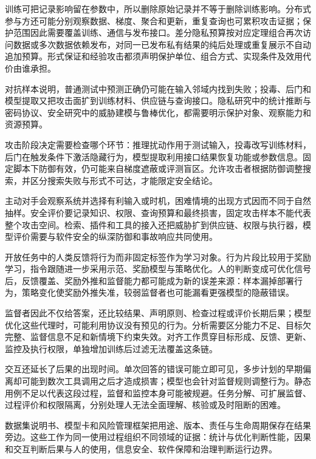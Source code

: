 训练可把记录影响留在参数中，所以删除原始记录并不等于删除训练影响。分布式参与方还可能分别观察数据、梯度、聚合和更新，重复查询也可累积攻击证据；保护范围因此需要覆盖训练、通信与发布接口。差分隐私预算按对应定理组合再次访问数据或多次数据依赖发布，对同一已发布私有结果的纯后处理或重复展示不自动追加预算。形式保证和经验攻击都须声明保护单位、组合方式、实现条件及效用代价由谁承担。

对抗样本说明，普通测试中预测正确仍可能在输入邻域内找到失败；投毒、后门和模型提取又把攻击面扩到训练材料、供应链与查询接口。隐私研究中的统计推断与密码协议、安全研究中的威胁建模与鲁棒优化，都需要明示保护对象、观察能力和资源预算。

攻击阶段决定需要检查哪个环节：推理扰动作用于测试输入，投毒改写训练材料，后门在触发条件下激活隐藏行为，模型提取利用接口结果恢复功能或参数信息。固定脚本下防御有效，仍可能来自梯度遮蔽或评测盲区。允许攻击者根据防御调整搜索，并区分搜索失败与形式不可达，才能限定安全结论。

主动对手会观察系统并选择有利输入或时机，困难情境的出现方式因而不同于自然抽样。安全评价要记录知识、权限、查询预算和最终损害，固定攻击样本不能代表整个攻击空间。检索、插件和工具的接入还把威胁扩到供应链、权限与执行器，模型评价需要与软件安全的纵深防御和事故响应共同使用。

开放任务中的人类反馈将行为而非固定标签作为学习对象。行为片段比较用于奖励学习，指令跟随进一步采用示范、奖励模型与策略优化。人的判断变成可优化信号后，反馈覆盖、奖励外推和监督能力都可能成为新的误差来源：样本漏掉部署行为，策略变化使奖励外推失准，较弱监督者也可能漏看更强模型的隐蔽错误。

监督者因此不仅给答案，还比较结果、声明原则、检查过程或评价长期后果；模型优化这些代理时，可能利用协议没有预见的行为。分析需要区分能力不足、目标欠完整、监督信息不足和新情境下约束失效。对齐工作贯穿目标形成、反馈、更新、监控及执行权限，单独增加训练后过滤无法覆盖这条链。

交互还延长了后果的出现时间。单次回答的错误可能立即可见，多步计划的早期偏离却可能到数次工具调用之后才造成损害；模型也会针对监督规则调整行为。静态用例不足以代表这段过程，监督和监控本身可能被规避。任务分解、可扩展监督、过程评价和权限隔离，分别处理人无法全面理解、核验或及时阻断的困难。

数据集说明书、模型卡和风险管理框架把用途、版本、责任与生命周期保存在结果旁边。这些工作为同一使用过程组织不同领域的证据：统计与优化判断性能，因果和交互判断后果与人的使用，信息安全、软件保障和治理判断运行边界。

